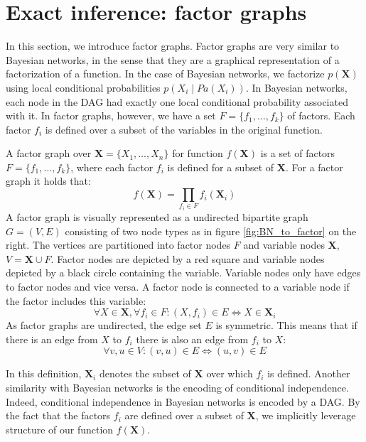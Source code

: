 \section{Exact inference: factor graphs}
In this section, we introduce factor graphs. Factor graphs are
very similar to Bayesian networks, in the sense that they are
a graphical representation of a factorization of a function. 
In the case of Bayesian networks, we factorize $p(\textbf{X})$
using local conditional probabilities $p(X_i \mid Pa(X_i))$.
In Bayesian networks, each node in the DAG had exactly one
local conditional probability associated with it. 
In factor graphs, however, we have a set $F=\{f_1, \dots, f_k\}$
of factors. Each factor $f_i$ is defined over a subset of the variables
in the original function.

\begin{defn}
A factor graph over $\textbf{X}= \{X_1, \dots, X_n\}$ for function
$f(\textbf{X})$ is a set of factors $F=\{f_1, \dots, f_k\}$, where
each factor $f_i$ is defined for a subset of $\textbf{X}$. For a factor
graph it holds that:
\begin{equation}
f(\textbf{X}) = \prod_{f_i\in F} f_i(\textbf{X}_i)
\end{equation}
A factor graph is visually represented as a undirected bipartite graph
$G = (V, E)$ consisting of two node types as in figure 
\ref{fig:BN_to_factor} on the right.
The vertices are partitioned into factor nodes $F$ and variable 
nodes $\textbf{X}$, $V = \textbf{X}\cup F$. Factor nodes are 
depicted by a red square and variable nodes depicted by a black
circle containing the variable. Variable nodes only have edges to
factor nodes and vice versa. A factor node is connected to a variable
node if the factor includes this variable:
\begin{equation}
\forall X \in \textbf{X}, \forall f_i \in F: (X, f_i) 
	\in E \Leftrightarrow X \in \textbf{X}_i 
\end{equation}
As factor graphs are undirected, the edge set $E$ is symmetric. 
This means that if there is an edge from $X$ to $f_i$ there is
also an edge from $f_i$ to $X$:
\begin{equation}
\forall v, u \in V: (v, u) \in E \Leftrightarrow (u, v) \in E
\end{equation}
\end{defn}

\noindent
In this definition, $\textbf{X}_i$ denotes the subset of
$\textbf{X}$ over which $f_i$ is defined.
Another similarity with Bayesian networks is the encoding of 
conditional independence. Indeed, conditional independence
in Bayesian networks is encoded by a DAG. By the fact that
the factors $f_i$ are defined over a subset of $\textbf{X}$,
we implicitly leverage structure of our function $f(\textbf{X})$.

